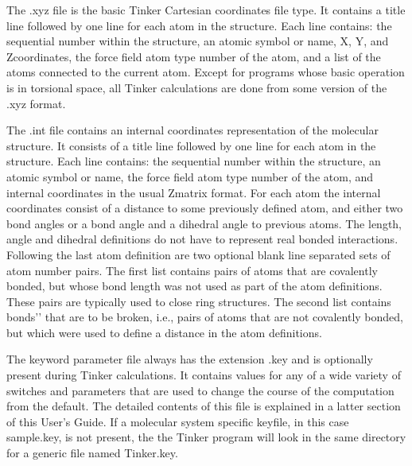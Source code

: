 \documentclass[letterpaper,11pt,english]{sphinxmanual}
\begin{document}

The .xyz file is the basic Tinker Cartesian coordinates file type. It contains a title line followed by one line for each atom in the structure. Each line contains: the sequential number within the structure, an atomic symbol or name, X\sphinxhyphen{}, Y\sphinxhyphen{}, and Z\sphinxhyphen{}coordinates, the force field atom type number of the atom, and a list of the atoms connected to the current atom. Except for programs whose basic operation is in torsional space, all Tinker calculations are done from some version of the .xyz format.


The .int file contains an internal coordinates representation of the molecular structure. It consists of a title line followed by one line for each atom in the structure. Each line contains: the sequential number within the structure, an atomic symbol or name, the force field atom type number of the atom, and internal coordinates in the usual Z\sphinxhyphen{}matrix format. For each atom the internal coordinates consist of a distance to some previously defined atom, and either two bond angles or a bond angle and a dihedral angle to previous atoms. The length, angle and dihedral definitions do not have to represent real bonded interactions. Following the last atom definition are two optional blank line separated sets of atom number pairs. The first list contains pairs of atoms that are covalently bonded, but whose bond length was not used as part of the atom definitions. These pairs are typically used to close ring structures. The second list contains {\color{red}\bfseries{}\textasciigrave{}\textasciigrave{}}bonds’’ that are to be broken, i.e., pairs of atoms that are not covalently bonded, but which were used to define a distance in the atom definitions.


The keyword parameter file always has the extension .key and is optionally present during Tinker calculations. It contains values for any of a wide variety of switches and parameters that are used to change the course of the computation from the default. The detailed contents of this file is explained in a latter section of this User’s Guide. If a molecular system specific keyfile, in this case sample.key, is not present, the the Tinker program will look in the same directory for a generic file named Tinker.key.

\end{document}
